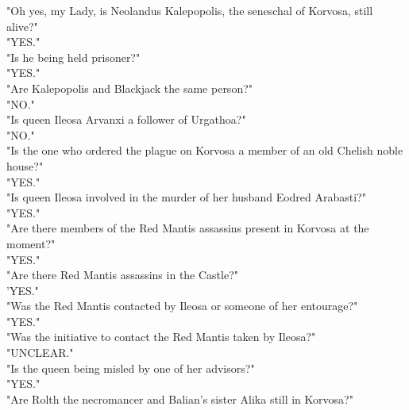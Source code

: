 "Oh yes, my Lady, is Neolandus Kalepopolis, the seneschal of Korvosa, still alive?"\\

"YES."\\

"Is he being held prisoner?"\\

"YES."\\

"Are Kalepopolis and Blackjack the same person?"\\

"NO."\\

"Is queen Ileosa Arvanxi a follower of Urgathoa?"\\

"NO."\\

"Is the one who ordered the plague on Korvosa a member of an old Chelish noble house?"\\

"YES."\\

"Is queen Ileosa involved in the murder of her husband Eodred Arabasti?"\\

"YES."\\

"Are there members of the Red Mantis assassins present in Korvosa at the moment?"\\

"YES."\\

"Are there Red Mantis assassins in the Castle?"\\

'YES."\\

"Was the Red Mantis contacted by Ileosa or someone of her entourage?"\\

"YES."\\

"Was the initiative to contact the Red Mantis taken by Ileosa?"\\

"UNCLEAR."\\

"Is the queen being misled by one of her advisors?"\\

"YES."\\

"Are Rolth the necromancer and Balian's sister Alika still in Korvosa?"\\

